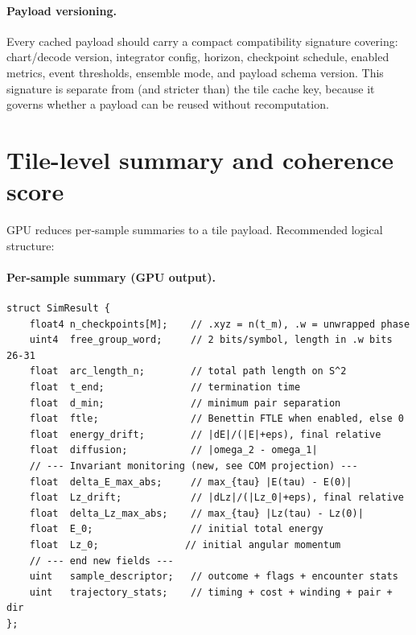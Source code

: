 \documentclass[11pt]{report}
\begin{document}
\paragraph{Payload versioning.} Every cached payload should carry a compact compatibility signature covering: chart/decode version, integrator config, horizon, checkpoint schedule, enabled metrics, event thresholds, ensemble mode, and payload schema version. This signature is separate from (and stricter than) the tile cache key, because it governs whether a payload can be reused without recomputation.

\section{Tile-level summary and coherence score}
\label{sec:tile_summary}

GPU reduces per-sample summaries to a tile payload. Recommended logical structure:

\paragraph{Per-sample summary (GPU output).}
\begin{verbatim}
struct SimResult {
    float4 n_checkpoints[M];    // .xyz = n(t_m), .w = unwrapped phase
    uint4  free_group_word;     // 2 bits/symbol, length in .w bits 26-31
    float  arc_length_n;        // total path length on S^2
    float  t_end;               // termination time
    float  d_min;               // minimum pair separation
    float  ftle;                // Benettin FTLE when enabled, else 0
    float  energy_drift;        // |dE|/(|E|+eps), final relative
    float  diffusion;           // |omega_2 - omega_1|
    // --- Invariant monitoring (new, see COM projection) ---
    float  delta_E_max_abs;     // max_{tau} |E(tau) - E(0)|
    float  Lz_drift;            // |dLz|/(|Lz_0|+eps), final relative
    float  delta_Lz_max_abs;    // max_{tau} |Lz(tau) - Lz(0)|
    float  E_0;                 // initial total energy
    float  Lz_0;               // initial angular momentum
    // --- end new fields ---
    uint   sample_descriptor;   // outcome + flags + encounter stats
    uint   trajectory_stats;    // timing + cost + winding + pair + dir
};
\end{verbatim}
\end{document}

